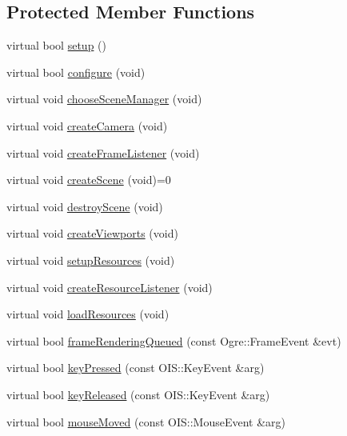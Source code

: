 \subsection*{Protected Member Functions}
\begin{DoxyCompactItemize}
\item 
virtual bool \hyperlink{class_base_application_a5853d0e148cb85b0297a6885e1d33a89}{setup} ()
\item 
virtual bool \hyperlink{class_base_application_a62ed46f90e9f82cc810997647a2c587e}{configure} (void)
\item 
virtual void \hyperlink{class_base_application_ad5bc9655041e1849a4c13f444a3712bd}{choose\-Scene\-Manager} (void)
\item 
virtual void \hyperlink{class_base_application_afa9d51527763cf9aee9cd4e1b1039d55}{create\-Camera} (void)
\item 
virtual void \hyperlink{class_base_application_aff6fd9ff1ff0978cc68f19dd65be4778}{create\-Frame\-Listener} (void)
\item 
virtual void \hyperlink{class_base_application_aa97beeb4059b17d0ec22eae33286ec2d}{create\-Scene} (void)=0
\item 
virtual void \hyperlink{class_base_application_a365146059b25391fe400f5fdb94f011e}{destroy\-Scene} (void)
\item 
virtual void \hyperlink{class_base_application_a1f8f6730cae6ec769d8730b1af48486e}{create\-Viewports} (void)
\item 
virtual void \hyperlink{class_base_application_ae27301702f1e5de64619a39b1929f1f9}{setup\-Resources} (void)
\item 
virtual void \hyperlink{class_base_application_a9b77972f0f747a61e1f8ceba2ad47641}{create\-Resource\-Listener} (void)
\item 
virtual void \hyperlink{class_base_application_aaeb764e637dd87601a81a80156659d88}{load\-Resources} (void)
\item 
virtual bool \hyperlink{class_base_application_a03912a0f38b38fede7f08a2571e8fc56}{frame\-Rendering\-Queued} (const Ogre\-::\-Frame\-Event \&evt)
\item 
virtual bool \hyperlink{class_base_application_acfa977f04e435f18018ece805c1277ec}{key\-Pressed} (const O\-I\-S\-::\-Key\-Event \&arg)
\item 
virtual bool \hyperlink{class_base_application_aba5c7c9dea7a0efc58b89310bae547e5}{key\-Released} (const O\-I\-S\-::\-Key\-Event \&arg)
\item 
virtual bool \hyperlink{class_base_application_a126e59cb246b061e51eb6ce06a2ee8f4}{mouse\-Moved} (const O\-I\-S\-::\-Mouse\-Event \&arg)

\end{DoxyCompactItemize}
